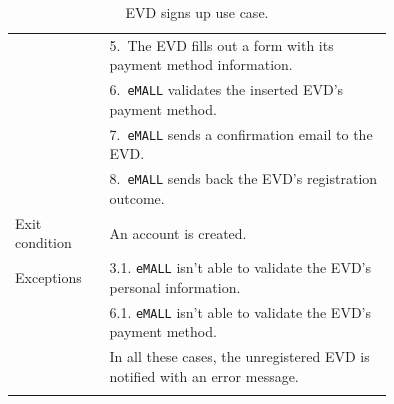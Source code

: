 \begin{center}
\begin{longtable}{lp{0.75\linewidth}}
        & 5.\ The EVD fills out a form with its payment method information.                                                                                                                                      \\
        & 6.\ \verb|eMALL| validates the inserted EVD’s payment method.                                                                                                                                                 \\
        & 7.\ \verb|eMALL| sends a confirmation email to the EVD.                                                                                                                                                       \\
        & 8.\ \verb|eMALL| sends back the EVD’s registration outcome.                                                                                                                                                   \\
        \hline
        Exit condition   & An account is created.                                                                                                                                                                                 \\
        \hline
        Exceptions       & 3.1. \verb|eMALL| isn’t able to validate the EVD’s personal information.                                                                                                                                      \\
        & 6.1. \verb|eMALL| isn’t able to validate the EVD’s payment method.                                                                                                                                            \\
        & In all these cases, the unregistered EVD is notified with an error message.                                                                                                                            \\
        \hline
        \caption{EVD signs up use case.}
        \label{tab: EVD_sign_up_use_case}
    \end{longtable}


\end{center}
